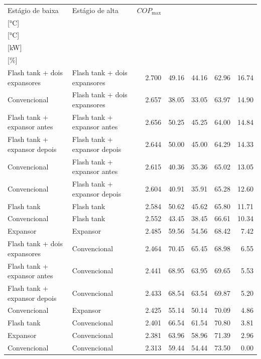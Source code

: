 {\small\setlength{\tabcolsep}{4pt}\renewcommand{\arraystretch}{1.12}
\begin{tabular}{llrrrrr}
\toprule
Estágio de baixa & Estágio de alta & $COP_{\max}$ & \shortstack{$T_{\mathrm{cond,l}}^*$\\{[°C]}} & \shortstack{$T_{\mathrm{evap,h}}^*$\\{[°C]}} & \shortstack{$\dot W_{\mathrm{liq}}$\\{[kW]}} & \shortstack{$\Delta COP_{\mathrm{opt}}$\\{[\%]}} \\
\midrule
Flash tank + dois expansores & Flash tank + dois expansores & 2.700 & 49.16 & 44.16 & 62.96 & 16.74 \\
Convencional & Flash tank + dois expansores & 2.657 & 38.05 & 33.05 & 63.97 & 14.90 \\
Flash tank + expansor antes & Flash tank + expansor antes & 2.656 & 50.25 & 45.25 & 64.00 & 14.84 \\
Flash tank + expansor depois & Flash tank + expansor depois & 2.644 & 50.00 & 45.00 & 64.29 & 14.33 \\
Convencional & Flash tank + expansor antes & 2.615 & 40.36 & 35.36 & 65.02 & 13.05 \\
Convencional & Flash tank + expansor depois & 2.604 & 40.91 & 35.91 & 65.28 & 12.60 \\
Flash tank & Flash tank & 2.584 & 50.62 & 45.62 & 65.80 & 11.71 \\
Convencional & Flash tank & 2.552 & 43.45 & 38.45 & 66.61 & 10.34 \\
Expansor & Expansor & 2.485 & 59.56 & 54.56 & 68.42 & 7.42 \\
Flash tank + dois expansores & Convencional & 2.464 & 70.45 & 65.45 & 68.98 & 6.55 \\
Flash tank + expansor antes & Convencional & 2.441 & 68.95 & 63.95 & 69.65 & 5.53 \\
Flash tank + expansor depois & Convencional & 2.433 & 68.54 & 63.54 & 69.87 & 5.20 \\
Convencional & Expansor & 2.425 & 55.14 & 50.14 & 70.09 & 4.86 \\
Flash tank & Convencional & 2.401 & 66.54 & 61.54 & 70.80 & 3.81 \\
Expansor & Convencional & 2.381 & 63.96 & 58.96 & 71.39 & 2.96 \\
Convencional & Convencional & 2.313 & 59.44 & 54.44 & 73.50 & 0.00 \\
\bottomrule
\end{tabular}
}
